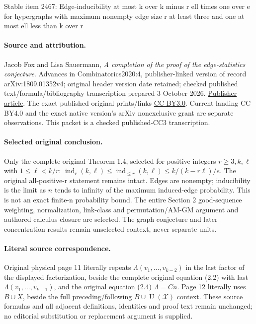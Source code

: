 \documentclass[11pt]{article}
\theoremstyle{definition}
\numberwithin{equation}{section}
\begin{document}
\begin{center}{\Large Stable item 2467: Edge-inducibility at most k over k minus r ell times one over e for hypergraphs with maximum nonempty edge size r at least three and one at most ell less than k over r}\end{center}
\paragraph{Source and attribution.} Jacob Fox and Lisa Sauermann, \emph{A completion of the proof of the edge-statistics conjecture}. Advances in Combinatorics2020:4, publisher-linked version of record arXiv:1809.01352v4; original header version date retained; checked published text/formula/bibliography transcription prepared 3 October 2026. \href{https://www.advancesincombinatorics.com/article/12047-a-completion-of-the-proof-of-the-edge-statistics-conjecture}{Publisher article}. The exact published original prints/links \href{https://creativecommons.org/licenses/by/3.0/}{CC BY3.0}. Current landing CC BY4.0 and the exact native version's arXiv nonexclusive grant are separate observations. This packet is a checked published-CC3 transcription.
\paragraph{Selected original conclusion.} Only the complete original Theorem 1.4, selected for positive integers \(r\ge3,k,\ell\) with \(1\le\ell<k/r\): \(\operatorname{ind}_r(k,\ell)\le\operatorname{ind}_{\le r}(k,\ell)\le k/(k-r\ell)/e\). The original all-positive-r statement remains intact. Edges are nonempty; inducibility is the limit as \(n\) tends to infinity of the maximum induced-edge probability. This is not an exact finite-n probability bound. The entire Section 2 good-sequence weighting, normalization, link-class and permutation/AM-GM argument and authored calculus closure are selected. The graph conjecture and later concentration results remain unselected context, never separate units.
\paragraph{Literal source correspondence.} Original physical page 11 literally repeats \(\Lambda(v_1,\ldots,v_{k-2})\) in the last factor of the displayed factorization, beside the complete original equation (2.2) with last \(\Lambda(v_1,\ldots,v_{k-1})\), and the original equation (2.4) \(\Lambda=Cn\). Page 12 literally uses \(B\cup X\), beside the full preceding/following \(B\cup\operatorname{U}(\mathcal{X})\) context. These source formulas and all adjacent definitions, identities and proof text remain unchanged; no editorial substitution or replacement argument is supplied.
\end{document}
